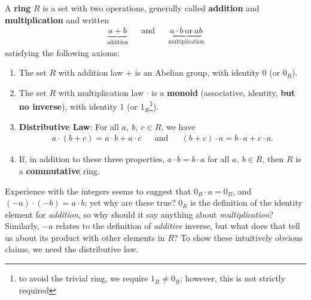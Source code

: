 \documentclass[math1530-lecture-notes]{subfiles}
\begin{document}
\begin{definition}[Rings]{}
  A \textbf{ring} $R$ is a set with two operations, generally called \textbf{addition} and
  \textbf{multiplication} and written
  \begin{align*}
    \underbrace{a+b}_{\text{addition}} &&\text{and}&& \underbrace{a\cdot b
    ~\text{or}~ab}_{\text{multiplication}}
  \end{align*}
  satisfying the following axioms:
  \begin{enumerate}
    \item The set $R$ with addition law $+$ is an Abelian group, with identity $0$ (or $0_R$).
    \item The set $R$ with multiplication law $\cdot $ is a \textbf{monoid} (associative, identity,
      \textbf{but no inverse}), with identity $1$ (or $1_R$\footnote{to avoid the trivial ring, we
      require $1_R\neq 0_R$; however, this is not strictly required}).
    \item \textbf{Distributive Law}: For all $a,\ b,\ c\in R$, we have
      \begin{align*}
        a\cdot (b+c)=a\cdot b+a\cdot c && \text{and} && (b+c)\cdot a= b\cdot a+c\cdot a
      .\end{align*}
    \item If, in addition to these three properties, $a\cdot b=b\cdot a$ for all $a,\ b\in R$, then
      $R$ is a \textbf{commutative} ring.
  \end{enumerate}
\end{definition}

Experience with the integers seems to suggest that $0_R\cdot a=0_R$, and $(-a)\cdot (-b)=a\cdot b$;
yet why are these true? $0_R$ is the definition of the identity element for \textit{addition}, so
why should it say anything about \textit{multiplication}? Similarly, $-a$ relates to the definition
of \textit{additive} inverse, but what does that tell us about its product with other elements in
$R$? To show these intuitively obvious claims, we need the distributive law.
\end{document}
